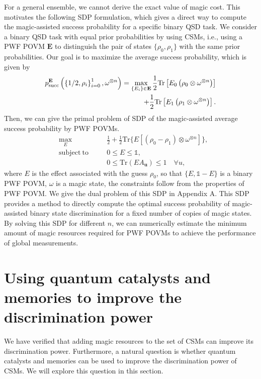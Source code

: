 \documentclass[aps,pra,twocolumn,floatfix,amsfonts,10pt]{revtex4-2}
\begin{document}
For a general ensemble, we cannot derive the exact value of magic cost.
This motivates the following SDP formulation, which gives a direct way to compute the magic-assisted success probability for a specific binary QSD task.
We consider a binary QSD task with equal prior probabilities by using CSMs, i.e., using a PWF POVM $\mathbf{E}$ to distinguish the pair of states $\{\rho_0, \rho_1\}$ with the same prior probabilities.
Our goal is to maximize the average success probability, which is given by
\begin{equation}
	\begin{aligned}
		p_{\rm{succ}}^{\mathbf{E}}\left(\left\{1/2, \rho_i\right\}_{i=0}^{1}, \omega^{\otimes n}\right) = \max_{\{E_i\}\in\mathbf{E}}\frac{1}{2}\mathrm{Tr}\left[E_0 \left(\rho_0 \otimes \omega^{\otimes n}\right)\right] \\ + \frac{1}{2}\mathrm{Tr}\left[E_1 \left(\rho_1 \otimes \omega^{\otimes n}\right)\right].
	\end{aligned}
\end{equation}
Then, we can give the primal problem of SDP of the magic-assisted average
success probability by PWF POVMs.
\begin{equation}
	\begin{aligned}
		&\max_{E} \quad &&\frac{1}{2}+\frac{1}{2}\mathrm{Tr}\{E[(\rho_0 - \rho_1)\otimes \omega^{\otimes n}]\}, \\ &\mathrm{subject~to} \quad && 0\leqslant E\leqslant\mathds{1},  \\ &&& 0\leqslant \mathrm{Tr}(EA_{\mathbf{u}})\leqslant 1 \quad \forall u,
	\end{aligned}
\end{equation}
where $E$ is the effect associated with the guess $\rho_0$, so that $\{E,\mathds{1}-E\}$ is a binary PWF POVM, $\omega$ is a magic state, the constraints follow from the properties of PWF POVM.
We give the dual problem of this SDP in Appendix A.
This SDP provides a method to directly compute the optimal success probability of magic-assisted binary state discrimination for a fixed number of copies of magic states. 
By solving this SDP for different $n$, we can numerically estimate the minimum amount of magic resources required for PWF POVMs to achieve the performance of global measurements.

\section{Using quantum catalysts and memories to improve the discrimination power}
We have verified that adding magic resources to the set of CSMs can improve its discrimination power. 
Furthermore, a natural question is whether quantum catalysts and memories can be used to improve the discrimination power of CSMs. 
We will explore this question in this section.
\end{document}
